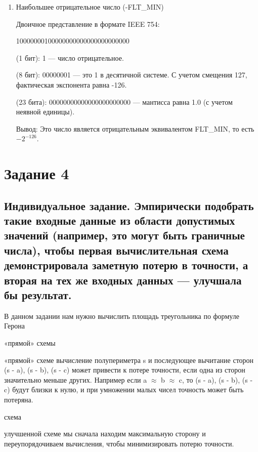 \documentclass{report}
\begin{document}
\begin{enumerate}
		\item{Наибольшее отрицательное число (-FLT\_MIN)}
		
		Двоичное представление в формате IEEE 754:
		\begin{center}
			10000000100000000000000000000000
		\end{center}
		
		\begin{itemize}
			 (1 бит): 1 — число отрицательное.
			
			 (8 бит): 00000001 — это 1 в десятичной системе. С учетом смещения 127, фактическая экспонента равна -126.
			
			 (23 бита): 00000000000000000000000 — мантисса равна 1.0 (с учетом неявной единицы).
		\end{itemize}
	
		Вывод:  Это число является отрицательным эквивалентом FLT\_MIN, то есть $-2^{-126}$.
	\end{enumerate}
		\chapter{Задание 4}
		
		\section{Индивидуальное задание. Эмпирически подобрать такие входные данные из области
			допустимых значений (например, это могут быть граничные числа), чтобы первая
			вычислительная схема демонстрировала заметную потерю в точности, а вторая на тех же
			входных данных — улучшала бы результат.}
			
		В данном задании нам нужно вычислить площадь треугольника по формуле Герона
		
		\begin{itemize}
			 «прямой» схемы
			\begin{itemize}
			 «прямой» схеме вычисление полупериметра s и последующее вычитание сторон (s - a), (s - b), (s - c) может привести к потере точности, если одна из сторон значительно меньше других. Например если a $\approx$ b $\approx$ c, то (s - a), (s - b), (s - c)  будут близки к нулю, и при умножении малых чисел точность может быть потеряна.
			\end{itemize}
			
			\itemУлучшенная схема
			
			\begin{itemize}
			 улучшенной схеме мы сначала находим максимальную сторону и переупорядочиваем вычисления, чтобы минимизировать потерю точности. 
			\end{itemize}
			\end{itemize}
			
\end{document}
